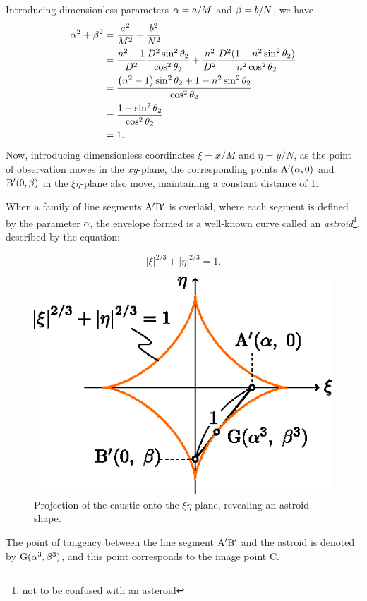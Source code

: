 \documentclass[twocolumn]{article}
\begin{document}
Introducing dimensionless parameters ${\alpha}={a}/M$ and ${\beta}={b}/N$, we have
%
$$ \begin{aligned}
	\greeka^2 + \greekb^2 &= \dfrac{\romana^2}{M^2}+\dfrac{\romanb^2}{N^2}\\
	&=\dfrac{n^2-1}{D^2}\dfrac{D^2\sin^2\theta_2}{\cos^2\theta_2}%
	+\dfrac{n^2}{D^2}\dfrac{D^2(1-n^2\sin^2\theta_2)}{n^2\cos^2\theta_2}\\
	&=\dfrac{\left(n^2-1\right)\sin^2\theta_2 + 1-n^2\sin^2\theta_2}
	{\cos^2\theta_2}\\
	&=\dfrac{1-\sin^2\theta_2}{\cos^2\theta_2}\\
	&= 1.
\end{aligned}$$
Now, introducing dimensionless coordinates $\xi=x/M$ and $\eta=y/N$, as the point of observation moves in the $xy$-plane, the corresponding points $\mathrm{{A^{\prime}}}(\alpha, 0)$ and $\mathrm{{B^{\prime}}}(0, \beta)$ in the $\xi\eta$-plane also move, maintaining a constant distance of 1. 

When a family of line segments ${\mathrm{{A^{\prime}}{B^{\prime}}}}$ is overlaid, where each segment is defined by the parameter $\alpha$, the envelope formed is a well-known curve called an \emph{astroid}\footnote{not to be confused with an asteroid}, described by the equation:

$$ \left| \xi \right|^{2/3} + \left| \eta \right|^{2/3} = 1. $$

\begin{figure}
	\centering
	\includegraphics{figs/g107.eps}	
	\caption{Projection of the caustic onto the $\xi\eta$ plane, revealing an astroid shape.}
	\label{fig:astroid}
\end{figure}

The point of tangency between the line segment ${\mathrm{{A^{\prime}}{B^{\prime}}}}$ and the astroid is denoted by $\mathrm{G}({\alpha}^3, {\beta}^3)$, and this point corresponds to the image point C. 
\end{document}
